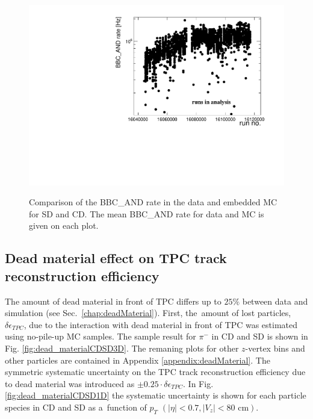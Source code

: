 \begin{figure}[H]
{	}
	\parbox{0.495\textwidth}{
		\centering
		\includegraphics[width=\linewidth,page=12]{graphics/systematicsEfficiency/bbc_and/Out.pdf}\\
	}
	\caption[Comparison of the BBC\_AND rate in the data  and   embedded MC for SD and CD.]{Comparison of the BBC\_AND rate in the data  and   embedded MC for SD and CD. The mean BBC\_AND rate for data and MC is given on each plot.}
	\label{fig:systErrorEmbDataRate}
\end{figure}

\subsection{Dead material effect on TPC track reconstruction efficiency}\label{sec:deadMaterialSystematics}
The amount of dead material in front of TPC differs up to $25\%$ between data and simulation (see Sec.~\ref{chap:deadMaterial}). First, the~amount of lost particles, $\delta\epsilon_{ TPC}$, due to the interaction with dead material in front of TPC was estimated using  no-pile-up  MC samples. The sample result for $\pi^-$ in CD and SD is shown in Fig. \ref{fig:dead_materialCDSD3D}. The remaning plots for other $z$-vertex bins and other particles are contained  in Appendix \ref{appendix:deadMaterial}.
The symmetric systematic uncertainty on the TPC track reconstruction efficiency due to dead material was introduced as $\pm 0.25 \cdot\delta\epsilon_{ TPC}$.
In Fig. \ref{fig:dead_materialCDSD1D}  the systematic uncertainty is shown for each particle species in CD and SD as a~function of $p_T$ $\left(|\eta|<0.7, |V_{z}|<80 \text{ cm}\right)$. 

